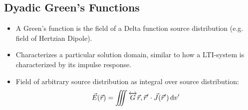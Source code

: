 \subsection{Dyadic Green's Functions}
\begin{itemize}
        \item A Green's function is the field of a Delta function source distribution (e.g. field of Hertzian Dipole).
        \item Characterizes a particular solution domain, similar to how a LTI-system is characterized by its impulse response.
  \item Field of arbitrary source distribution as integral over source distribution:
        \begin{align*}
          \vec{E}(\vec{r}) = \iiint\overleftrightarrow{G}{\vec{r},\vec{r}'} \cdot \vec{J}(\vec{r}')\,\mathrm{d}v'
        \end{align*}
\end{itemize}

